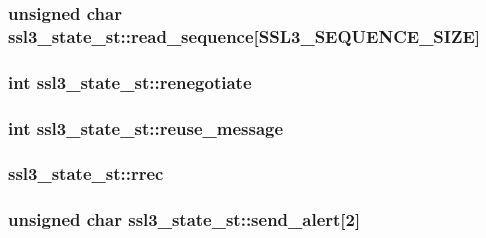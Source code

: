 \subsubsection[{\texorpdfstring{read\+\_\+sequence}{read_sequence}}]{\setlength{\rightskip}{0pt plus 5cm}unsigned char ssl3\+\_\+state\+\_\+st\+::read\+\_\+sequence\mbox{[}{\bf S\+S\+L3\+\_\+\+S\+E\+Q\+U\+E\+N\+C\+E\+\_\+\+S\+I\+ZE}\mbox{]}}\hypertarget{structssl3__state__st_a4688d677afb6b8193bd777af475c5871}{}\label{structssl3__state__st_a4688d677afb6b8193bd777af475c5871}
\subsubsection[{\texorpdfstring{renegotiate}{renegotiate}}]{\setlength{\rightskip}{0pt plus 5cm}int ssl3\+\_\+state\+\_\+st\+::renegotiate}\hypertarget{structssl3__state__st_af414cf3d9a29b6ae4974b4d0e69b5985}{}\label{structssl3__state__st_af414cf3d9a29b6ae4974b4d0e69b5985}
\subsubsection[{\texorpdfstring{reuse\+\_\+message}{reuse_message}}]{\setlength{\rightskip}{0pt plus 5cm}int ssl3\+\_\+state\+\_\+st\+::reuse\+\_\+message}\hypertarget{structssl3__state__st_a0b38a2fcee11ac89bc12aad936379ec3}{}\label{structssl3__state__st_a0b38a2fcee11ac89bc12aad936379ec3}
\subsubsection[{\texorpdfstring{rrec}{rrec}}]{ ssl3\+\_\+state\+\_\+st\+::rrec}\hypertarget{structssl3__state__st_affde905dbcf7ece7aab929f37ffe043a}{}\label{structssl3__state__st_affde905dbcf7ece7aab929f37ffe043a}
\subsubsection[{\texorpdfstring{send\+\_\+alert}{send_alert}}]{\setlength{\rightskip}{0pt plus 5cm}unsigned char ssl3\+\_\+state\+\_\+st\+::send\+\_\+alert\mbox{[}2\mbox{]}}\hypertarget{structssl3__state__st_a0afda55ccacf2d0f58fdc034c7d2b34b}{}\label{structssl3__state__st_a0afda55ccacf2d0f58fdc034c7d2b34b}
